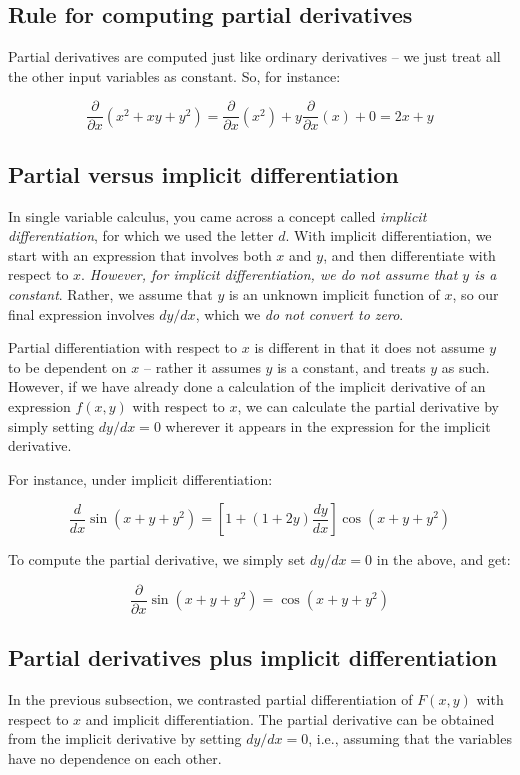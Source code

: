 \documentclass[10pt]{amsart}
\begin{document}
\subsection{Rule for computing partial derivatives}

Partial derivatives are computed just like ordinary derivatives -- we
just treat all the other input variables as constant. So, for instance:

$$\frac{\partial}{\partial x}(x^2 + xy + y^2) =
\frac{\partial}{\partial x}(x^2) + y\frac{\partial}{\partial x}(x) + 0 = 2x + y$$

\subsection{Partial versus implicit differentiation}

In single variable calculus, you came across a concept called {\em
implicit differentiation}, for which we used the letter $d$. With
implicit differentiation, we start with an expression that involves
both $x$ and $y$, and then differentiate with respect to $x$. {\em
However, for implicit differentiation, we do not assume that $y$ is a
constant}. Rather, we assume that $y$ is an unknown implicit function
of $x$, so our final expression involves $dy/dx$, which we {\em do not
convert to zero}.

Partial differentiation with respect to $x$ is different in that it
does not assume $y$ to be dependent on $x$ -- rather it assumes $y$ is
a constant, and treats $y$ as such. However, if we have already done a
calculation of the implicit derivative of an expression $f(x,y)$ with
respect to $x$, we can calculate the partial derivative by simply
setting $dy/dx = 0$ wherever it appears in the expression for the
implicit derivative.

For instance, under implicit differentiation:

$$\frac{d}{dx}\sin(x + y + y^2) = \left[1 + (1 + 2y)\frac{dy}{dx}\right]\cos(x + y + y^2)$$

To compute the partial derivative, we simply set $dy/dx = 0$ in the above, and get:

$$\frac{\partial}{\partial x}\sin(x + y + y^2) = \cos(x + y + y^2)$$

\subsection{Partial derivatives plus implicit differentiation}

In the previous subsection, we contrasted partial differentiation of
$F(x,y)$ with respect to $x$ and implicit differentiation. The partial
derivative can be obtained from the implicit derivative by setting
$dy/dx = 0$, i.e., assuming that the variables have no dependence on
each other.
\end{document}
